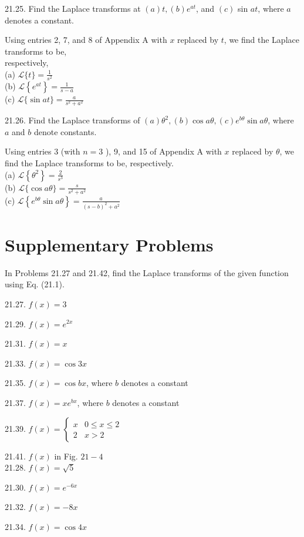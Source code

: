 \documentclass[10pt]{article}
\begin{document}
21.25. Find the Laplace transforms at $(a) t,(b) e^{a t}$, and $(c)$ sin $a t$, where $a$ denotes a constant.

Using entries 2, 7, and 8 of Appendix A with $x$ replaced by $t$, we find the Laplace transforms to be,\\
respectively,\\
(a) $\mathscr{L}\{t\}=\frac{1}{s^{2}}$\\
(b) $\mathscr{L}\left\{e^{a t}\right\}=\frac{1}{s-a}$\\
(c) $\mathscr{L}\{\sin a t\}=\frac{a}{s^{2}+a^{2}}$

21.26. Find the Laplace transforms of $(a) \theta^{2},(b) \cos a \theta,(c) e^{b \theta} \sin a \theta$, where $a$ and $b$ denote constants.

Using entries 3 (with $n=3$ ), 9, and 15 of Appendix A with $x$ replaced by $\theta$, we find the Laplace transforms to be, respectively.\\
(a) $\mathscr{L}\left\{\theta^{2}\right\}=\frac{2}{s^{3}}$\\
(b) $\mathscr{L}\{\cos a \theta\}=\frac{s}{s^{2}+a^{2}}$\\
(c) $\mathscr{L}\left\{e^{b \theta} \sin a \theta\right\}=\frac{a}{(s-b)^{2}+a^{2}}$

\section*{Supplementary Problems}
In Problems 21.27 and 21.42, find the Laplace transforms of the given function using Eq. (21.1).

21.27. $f(x)=3$

21.29. $f(x)=e^{2 x}$

21.31. $f(x)=x$

21.33. $f(x)=\cos 3 x$

21.35. $f(x)=\cos b x$, where $b$ denotes a constant

21.37. $f(x)=x e^{b x}$, where $b$ denotes a constant

21.39. $f(x)=\left\{\begin{array}{rr}x & 0 \leq x \leq 2 \\ 2 & x>2\end{array}\right.$

21.41. $f(x)$ in Fig. $21-4$\\
21.28. $f(x)=\sqrt{5}$

21.30. $f(x)=e^{-6 x}$

21.32. $f(x)=-8 x$

21.34. $f(x)=\cos 4 x$
\end{document}
